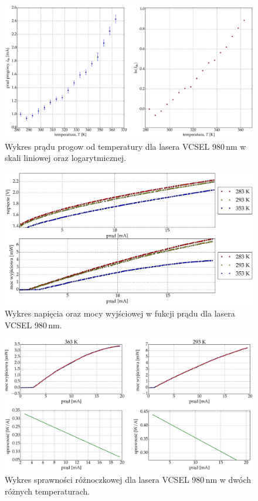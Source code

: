 \begin{figure}
\center
  \includegraphics[scale=0.30]{plot980/plot_temp_i_th_log_lin.eps}
  \caption{Wykres prądu progow od temperatury dla lasera VCSEL 980\,nm w skali liniowej oraz logarytmicznej.}
  \label{fig:plot_temp_i_th_log_lin_980}
\end{figure}
\begin{figure}
\center
  \includegraphics[scale=0.30]{plot980/plot_i_v_i_l.eps}
  \caption{Wykres napięcia oraz mocy wyjściowej w fukcji prądu dla lasera VCSEL 980\,nm.}
  \label{fig:plot_i_v_i_l_980}
\end{figure}
\begin{figure}
\center
  \includegraphics[scale=0.30]{plot980/plot_eff_via_current4.eps}
  \caption{Wykres sprawności różnoczkowej dla lasera VCSEL 980\,nm w dwóch różnych temperaturach.}
  \label{fig:plot_eff_via_current4_980}
\end{figure}
